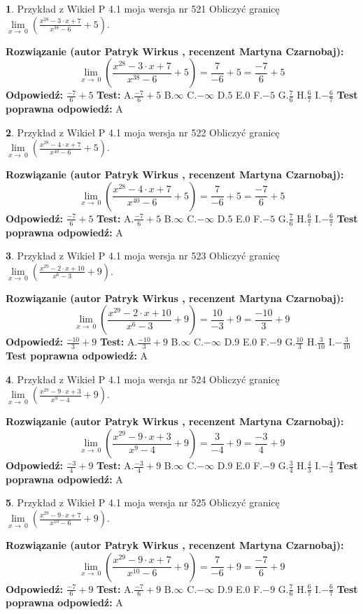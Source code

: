 \documentclass[12pt, a4paper]{article}
\theoremstyle{definition} %
\newtheorem{zad}{}
\newcommand{\zadStart}[1]{\begin{zad}#1\newline}
\newcommand{\zadStop}{\end{zad}}
\newcommand{\rozwStart}[2]{\noindent \textbf{Rozwiązanie (autor #1 , recenzent #2): }\newline}
\newcommand{\rozwStop}{\newline}
\newcommand{\odpStart}{\noindent \textbf{Odpowiedź:}\newline}
\newcommand{\odpStop}{\newline}
\newcommand{\testStart}{\noindent \textbf{Test:}\newline}
\newcommand{\testStop}{\newline}
\newcommand{\kluczStart}{\noindent \textbf{Test poprawna odpowiedź:}\newline}
\newcommand{\kluczStop}{\newline}
\begin{document}
\zadStart{Przykład z Wikieł P 4.1 moja wersja nr 521}
Obliczyć granicę $\lim\limits_{x\to\ 0}(\frac{x^{28}-3 \cdot x +7}{x^{38}-6}+5)$.
\zadStop
\rozwStart{Patryk Wirkus}{Martyna Czarnobaj}
$$\lim\limits_{x\to\ 0}(\frac{x^{28}-3 \cdot x +7}{x^{38}-6}+5)=\frac{7}{-6}+5=\frac{-7}{6}+5$$
\rozwStop
\odpStart
$\frac{-7}{6}+5$
\odpStop
\testStart
A.$\frac{-7}{6}+5$
B.$\infty$
C.$-\infty$
D.$5$
E.$0$
F.$-5$
G.$\frac{7}{6}$
H.$\frac{6}{7}$
I.$-\frac{6}{7}$
\testStop
\kluczStart
A
\kluczStop



\zadStart{Przykład z Wikieł P 4.1 moja wersja nr 522}
Obliczyć granicę $\lim\limits_{x\to\ 0}(\frac{x^{28}-4 \cdot x +7}{x^{40}-6}+5)$.
\zadStop
\rozwStart{Patryk Wirkus}{Martyna Czarnobaj}
$$\lim\limits_{x\to\ 0}(\frac{x^{28}-4 \cdot x +7}{x^{40}-6}+5)=\frac{7}{-6}+5=\frac{-7}{6}+5$$
\rozwStop
\odpStart
$\frac{-7}{6}+5$
\odpStop
\testStart
A.$\frac{-7}{6}+5$
B.$\infty$
C.$-\infty$
D.$5$
E.$0$
F.$-5$
G.$\frac{7}{6}$
H.$\frac{6}{7}$
I.$-\frac{6}{7}$
\testStop
\kluczStart
A
\kluczStop



\zadStart{Przykład z Wikieł P 4.1 moja wersja nr 523}
Obliczyć granicę $\lim\limits_{x\to\ 0}(\frac{x^{29}-2 \cdot x +10}{x^{6}-3}+9)$.
\zadStop
\rozwStart{Patryk Wirkus}{Martyna Czarnobaj}
$$\lim\limits_{x\to\ 0}(\frac{x^{29}-2 \cdot x +10}{x^{6}-3}+9)=\frac{10}{-3}+9=\frac{-10}{3}+9$$
\rozwStop
\odpStart
$\frac{-10}{3}+9$
\odpStop
\testStart
A.$\frac{-10}{3}+9$
B.$\infty$
C.$-\infty$
D.$9$
E.$0$
F.$-9$
G.$\frac{10}{3}$
H.$\frac{3}{10}$
I.$-\frac{3}{10}$
\testStop
\kluczStart
A
\kluczStop



\zadStart{Przykład z Wikieł P 4.1 moja wersja nr 524}
Obliczyć granicę $\lim\limits_{x\to\ 0}(\frac{x^{29}-9 \cdot x +3}{x^{9}-4}+9)$.
\zadStop
\rozwStart{Patryk Wirkus}{Martyna Czarnobaj}
$$\lim\limits_{x\to\ 0}(\frac{x^{29}-9 \cdot x +3}{x^{9}-4}+9)=\frac{3}{-4}+9=\frac{-3}{4}+9$$
\rozwStop
\odpStart
$\frac{-3}{4}+9$
\odpStop
\testStart
A.$\frac{-3}{4}+9$
B.$\infty$
C.$-\infty$
D.$9$
E.$0$
F.$-9$
G.$\frac{3}{4}$
H.$\frac{4}{3}$
I.$-\frac{4}{3}$
\testStop
\kluczStart
A
\kluczStop



\zadStart{Przykład z Wikieł P 4.1 moja wersja nr 525}
Obliczyć granicę $\lim\limits_{x\to\ 0}(\frac{x^{29}-9 \cdot x +7}{x^{10}-6}+9)$.
\zadStop
\rozwStart{Patryk Wirkus}{Martyna Czarnobaj}
$$\lim\limits_{x\to\ 0}(\frac{x^{29}-9 \cdot x +7}{x^{10}-6}+9)=\frac{7}{-6}+9=\frac{-7}{6}+9$$
\rozwStop
\odpStart
$\frac{-7}{6}+9$
\odpStop
\testStart
A.$\frac{-7}{6}+9$
B.$\infty$
C.$-\infty$
D.$9$
E.$0$
F.$-9$
G.$\frac{7}{6}$
H.$\frac{6}{7}$
I.$-\frac{6}{7}$
\testStop
\kluczStart
A
\kluczStop
\end{document}
